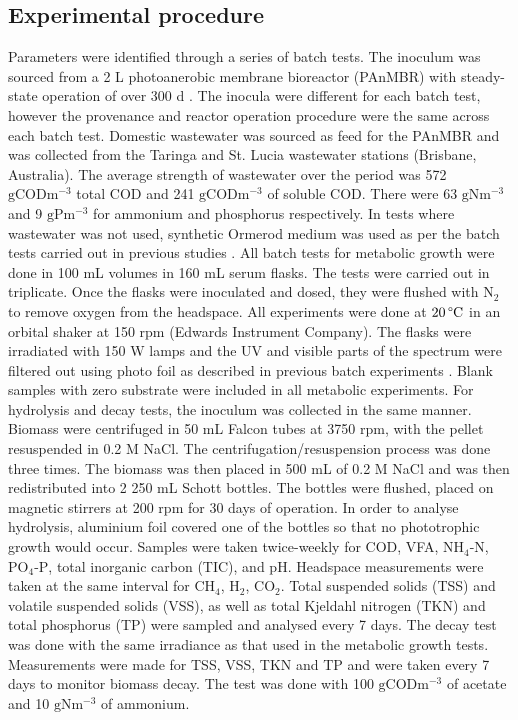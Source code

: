 \subsection{Experimental procedure}
Parameters were identified through a series of batch tests. The inoculum was sourced from a 2 L photoanerobic membrane bioreactor (PAnMBR) with steady-state operation of over 300 d \cite{hulsen2016}. The inocula were different for each batch test, however the provenance and reactor operation procedure were the same across each batch test. Domestic wastewater was sourced as feed for the PAnMBR and was collected from the Taringa and St. Lucia wastewater stations (Brisbane, Australia). The average strength of wastewater over the period was 572 $\mathrm{g COD m^{-3}}$ total COD and 241 $\mathrm{g COD m^{-3}}$ of soluble COD. There were 63 $\mathrm{g N m^{-3}}$ and 9 $\mathrm{g P m^{-3}}$ for ammonium and phosphorus respectively. In tests where wastewater was not used, synthetic Ormerod medium was used as per the batch tests carried out in previous studies \cite{hulsen2014}. 
\skippingparagraph
All batch tests for metabolic growth were done in 100 mL volumes in 160 mL serum flasks. The tests were carried out in triplicate. Once the flasks were inoculated and dosed, they were flushed with $\mathrm{N_2}$ to remove oxygen from the headspace. All experiments were done at $\mathrm{20 \, \degree C}$ in an orbital shaker at 150 rpm (Edwards Instrument Company). The flasks were irradiated with 150 W lamps and the UV and visible parts of the spectrum were filtered out using photo foil as described in previous batch experiments \cite{hulsen2014}. Blank samples with zero substrate were included in all metabolic experiments.
\skippingparagraph
For hydrolysis and decay tests, the inoculum was collected in the same manner. Biomass were centrifuged in 50 mL Falcon tubes at 3750 rpm, with the pellet resuspended in 0.2 M NaCl. The centrifugation/resuspension process was done three times. The biomass was then placed in 500 mL of 0.2 M NaCl and was then redistributed into 2 250 mL Schott bottles. The bottles were flushed, placed on magnetic stirrers at 200 rpm for 30 days of operation. In order to analyse hydrolysis, aluminium foil covered one of the bottles so that no phototrophic growth would occur. Samples were taken twice-weekly for COD, VFA, $\mathrm{NH_4\mbox{-}N}$, $\mathrm{PO_4\mbox{-}P}$, total inorganic carbon (TIC), and pH. Headspace measurements were taken at the same interval for $\mathrm{CH_4}$, $\mathrm{H_2}$, $\mathrm{CO_2}$. Total suspended solids (TSS) and volatile suspended solids (VSS), as well as total Kjeldahl nitrogen (TKN) and total phosphorus (TP) were sampled and analysed every 7 days. The decay test was done with the same irradiance as that used in the metabolic growth tests. Measurements were made for TSS, VSS, TKN and TP and were taken every 7 days to monitor biomass decay. The test was done with 100 $\mathrm{g COD m^{-3}}$ of acetate and 10 $\mathrm{g N m^{-3}}$ of ammonium. 
